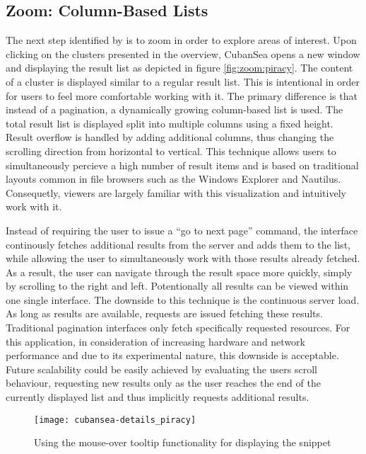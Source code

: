 \subsection{Zoom: Column-Based Lists}
The next step identified by \cite{Shneiderman1996} is to zoom in order to explore areas of interest. Upon clicking on the clusters presented in the overview, CubanSea opens a new window and displaying the result list as depicted in figure \ref{fig:zoom:piracy}. The content of a cluster is displayed similar to a regular result list. This is intentional in order for users to feel more comfortable working with it. The primary difference is that instead of a pagination, a dynamically growing column-based list is used. The total result list is displayed split into multiple columns using a fixed height. Result overflow is handled by adding additional columns, thus changing the scrolling direction from horizontal to vertical. This technique allows users to simultaneously percieve a high number of result items and is based on traditional layouts common in file browsers such as the Windows Explorer and Nautilus. Consequetly, viewers are largely familiar with this visualization and intuitively work with it.

Instead of requiring the user to issue a ``go to next page'' command, the interface continously fetches additional results from the server and adds them to the list, while allowing the user to simultaneously work with those results already fetched. As a result, the user can navigate through the result space more quickly, simply by scrolling to the right and left. Potentionally all results can be viewed within one single interface. The downside to this technique is the continuous server load. As long as results are available, requests are issued fetching these results. Traditional pagination interfaces only fetch specifically requested resources. For this application, in consideration of increasing hardware and network performance and due to its experimental nature, this downside is acceptable. Future scalability could be easily achieved by evaluating the users scroll behaviour, requesting new results only as the user reaches the end of the currently displayed list and thus implicitly requests additional results.

\begin{figure*}[!t]
	\centering
	\texttt{[image: cubansea-details\_piracy]}
	\caption{Using the mouse-over tooltip functionality for displaying the snippet}
	\label{fig:details:piracy}
\end{figure*}

